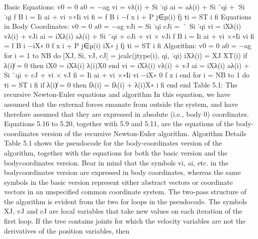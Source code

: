 Basic Equations: v0 = 0 a0 = −ag vi = vλ(i) + Si ˙qi ai = aλ(i) + Si ¨qi + ˙Si ˙qi f B i = Ii ai + vi ×∗Ii vi fi = f B i −f x i + P j∈µ(i) fj τi = ST i fi Equations in Body Coordinates: v0 = 0 a0 = −ag vJi = Si ˙qi cJi = ˚ Si ˙qi vi = iXλ(i) vλ(i) + vJi ai = iXλ(i) aλ(i) + Si ¨qi + cJi + vi × vJi f B i = Ii ai + vi ×∗Ii vi fi = f B i −iX∗ 0 f x i + P j∈µ(i) iX∗ j fj τi = ST i fi Algorithm: v0 = 0 a0 = −ag for i = 1 to NB do [XJ, Si, vJ, cJ] = jcalc(jtype(i), qi, ˙qi) iXλ(i) = XJ XT(i) if λ(i)̸ = 0 then iX0 = iXλ(i) λ(i)X0 end vi = iXλ(i) vλ(i) + vJ ai = iXλ(i) aλ(i) + Si ¨qi + cJ + vi × vJ fi = Ii ai + vi ×∗Ii vi −iX∗ 0 f x i end for i = NB to 1 do τi = ST i fi if λ(i)̸ = 0 then fλ(i) = fλ(i) + λ(i)X∗ i fi end end Table 5.1: The recursive Newton-Euler equations and algorithm In this equation, we have assumed that the external forces emanate from outside the system, and have therefore assumed that they are expressed in absolute (i.e., body 0) coordinates. Equations 5.16 to 5.20, together with 5.9 and 5.11, are the equations of the body-coordinates version of the recursive Newton-Euler algorithm. Algorithm Details Table 5.1 shows the pseudocode for the body-coordinates version of the algorithm, together with the equations for both the basic version and the bodycoordinates version. Bear in mind that the symbols vi, ai, etc. in the bodycoordinates version are expressed in body coordinates, whereas the same symbols in the basic version represent either abstract vectors or coordinate vectors in an unspecified common coordinate system. The two-pass structure of the algorithm is evident from the two for loops in the pseudocode. The symbols XJ, vJ and cJ are local variables that take new values on each iteration of the first loop. If the tree contains joints for which the velocity variables are not the derivatives of the position variables, then


